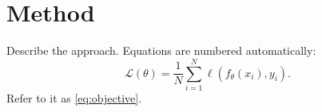\section{Method}
\label{sec:method}

Describe the approach. Equations are numbered automatically:
\begin{equation}
  \label{eq:objective}
  \mathcal{L}(\theta) = \frac{1}{N} \sum_{i=1}^{N} \ell\left(f_\theta(x_i), y_i\right).
\end{equation}
Refer to it as \cref{eq:objective}.
